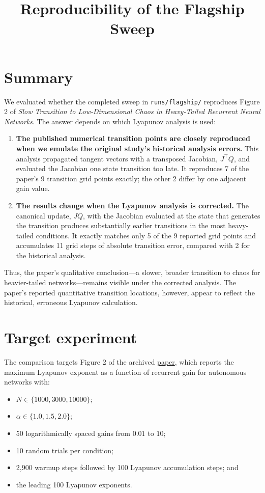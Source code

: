 \documentclass[11pt]{article}
\title{Reproducibility of the Flagship Sweep}
\date{}
\begin{document}
\raggedright

\maketitle

\section{Summary}

We evaluated whether the completed sweep in \texttt{runs/flagship/} reproduces Figure
2 of \emph{Slow Transition to Low-Dimensional Chaos in Heavy-Tailed Recurrent Neural
Networks}. The answer depends on which Lyapunov analysis is used:

\begin{enumerate}
\item \textbf{The published numerical transition points are closely reproduced when we
emulate the original study's historical analysis errors.} This analysis
propagated tangent vectors with a transposed Jacobian, $J^\top Q$, and
evaluated the Jacobian one state transition too late. It reproduces 7 of the
paper's 9 transition grid points exactly; the other 2 differ by one adjacent
gain value.
\item \textbf{The results change when the Lyapunov analysis is corrected.} The canonical
update, $JQ$, with the Jacobian evaluated at the state that generates the
transition produces substantially earlier transitions in the most
heavy-tailed conditions. It exactly matches only 5 of the 9 reported grid
points and accumulates 11 grid steps of absolute transition error, compared
with 2 for the historical analysis.
\end{enumerate}

Thus, the paper's qualitative conclusion---a slower, broader transition to chaos
for heavier-tailed networks---remains visible under the corrected analysis. The
paper's reported quantitative transition locations, however, appear to reflect
the historical, erroneous Lyapunov calculation.

\section{Target experiment}

The comparison targets Figure 2 of the archived \href{original/paper.pdf}{paper},
which reports the maximum Lyapunov exponent as a function of recurrent gain for
autonomous networks with:

\begin{itemize}
\item $N\in\{1000,3000,10000\}$;
\item $\alpha\in\{1.0,1.5,2.0\}$;
\item 50 logarithmically spaced gains from $0.01$ to $10$;
\item 10 random trials per condition;
\item 2,900 warmup steps followed by 100 Lyapunov accumulation steps; and
\item the leading 100 Lyapunov exponents.
\end{itemize}
\end{document}
